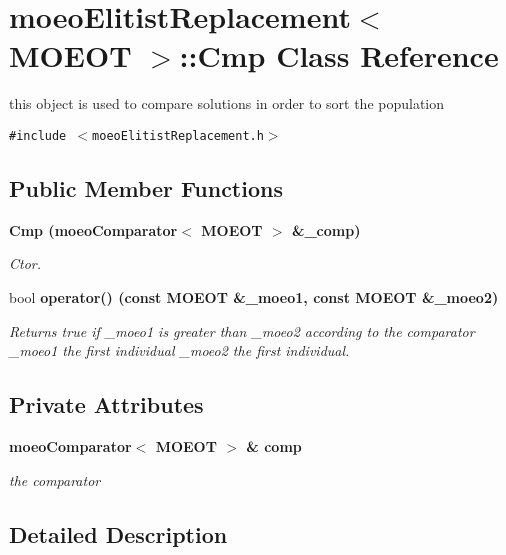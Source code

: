 \section{moeo\-Elitist\-Replacement$<$ MOEOT $>$::Cmp Class Reference}
\label{classmoeoElitistReplacement_1_1Cmp}
this object is used to compare solutions in order to sort the population  


{\tt \#include $<$moeo\-Elitist\-Replacement.h$>$}

\subsection*{Public Member Functions}
\begin{CompactItemize}
\item 
\bf{Cmp} (\bf{moeo\-Comparator}$<$ MOEOT $>$ \&\_\-comp)
\begin{CompactList}\small\item\em Ctor. \item\end{CompactList}\item 
bool \bf{operator()} (const MOEOT \&\_\-moeo1, const MOEOT \&\_\-moeo2)\label{classmoeoElitistReplacement_1_1Cmp_2411b927dde02225114635e776ce863f}

\begin{CompactList}\small\item\em Returns true if \_\-moeo1 is greater than \_\-moeo2 according to the comparator \_\-moeo1 the first individual \_\-moeo2 the first individual. \item\end{CompactList}\end{CompactItemize}
\subsection*{Private Attributes}
\begin{CompactItemize}
\item 
\bf{moeo\-Comparator}$<$ MOEOT $>$ \& \bf{comp}\label{classmoeoElitistReplacement_1_1Cmp_c7c0d0839bcbe86455d9f1064884219a}

\begin{CompactList}\small\item\em the comparator \item\end{CompactList}\end{CompactItemize}


\subsection{Detailed Description}
